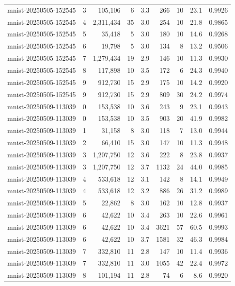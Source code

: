 \begin{tabular}{llrrrrrrr}
mnist-20250505-152545 & 3 & 105,106 & 6 & 3.3 & 266 & 10 & 23.1 & 0.9926 \\
mnist-20250505-152545 & 4 & 2,311,434 & 35 & 3.0 & 254 & 10 & 21.8 & 0.9865 \\
mnist-20250505-152545 & 5 & 35,418 & 5 & 3.0 & 180 & 10 & 14.6 & 0.9268 \\
mnist-20250505-152545 & 6 & 19,798 & 5 & 3.0 & 134 & 8 & 13.2 & 0.9506 \\
mnist-20250505-152545 & 7 & 1,279,434 & 19 & 2.9 & 146 & 10 & 11.3 & 0.9930 \\
mnist-20250505-152545 & 8 & 117,898 & 10 & 3.5 & 172 & 6 & 24.3 & 0.9940 \\
mnist-20250505-152545 & 9 & 912,730 & 15 & 2.9 & 175 & 10 & 14.2 & 0.9920 \\
mnist-20250505-152545 & 9 & 912,730 & 15 & 2.9 & 809 & 30 & 24.2 & 0.9974 \\
mnist-20250509-113039 & 0 & 153,538 & 10 & 3.6 & 243 & 9 & 23.1 & 0.9943 \\
mnist-20250509-113039 & 0 & 153,538 & 10 & 3.5 & 903 & 20 & 41.9 & 0.9982 \\
mnist-20250509-113039 & 1 & 31,158 & 8 & 3.0 & 118 & 7 & 13.0 & 0.9944 \\
mnist-20250509-113039 & 2 & 66,410 & 15 & 3.0 & 147 & 10 & 11.3 & 0.9948 \\
mnist-20250509-113039 & 3 & 1,207,750 & 12 & 3.6 & 222 & 8 & 23.8 & 0.9937 \\
mnist-20250509-113039 & 3 & 1,207,750 & 12 & 3.7 & 1132 & 24 & 44.0 & 0.9985 \\
mnist-20250509-113039 & 4 & 533,618 & 12 & 3.1 & 142 & 8 & 14.1 & 0.9949 \\
mnist-20250509-113039 & 4 & 533,618 & 12 & 3.2 & 886 & 26 & 31.2 & 0.9989 \\
mnist-20250509-113039 & 5 & 22,862 & 8 & 3.0 & 162 & 10 & 12.8 & 0.9937 \\
mnist-20250509-113039 & 6 & 42,622 & 10 & 3.4 & 263 & 10 & 22.6 & 0.9961 \\
mnist-20250509-113039 & 6 & 42,622 & 10 & 3.4 & 3621 & 57 & 60.5 & 0.9993 \\
mnist-20250509-113039 & 6 & 42,622 & 10 & 3.7 & 1581 & 32 & 46.3 & 0.9984 \\
mnist-20250509-113039 & 7 & 332,810 & 11 & 2.8 & 147 & 10 & 11.4 & 0.9936 \\
mnist-20250509-113039 & 7 & 332,810 & 11 & 3.0 & 1055 & 42 & 22.4 & 0.9972 \\
mnist-20250509-113039 & 8 & 101,194 & 11 & 2.8 & 74 & 6 & 8.6 & 0.9920 \\

\end{tabular}
